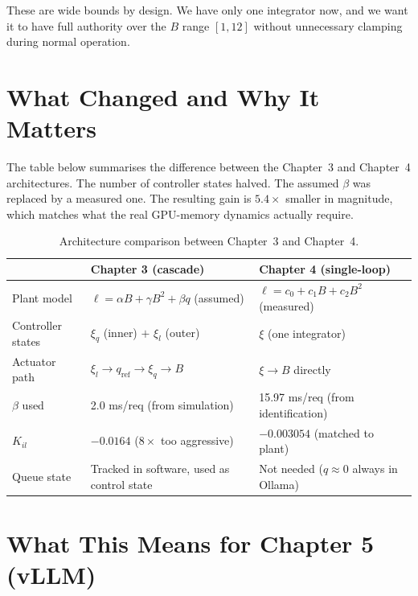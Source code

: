 \documentclass[11pt]{article}
\begin{document}
These are wide bounds by design.  We have only one integrator now, and
we want it to have full authority over the $B$ range $[1, 12]$ without
unnecessary clamping during normal operation.

\section*{What Changed and Why It Matters}

The table below summarises the difference between the Chapter~3 and
Chapter~4 architectures.  The number of controller states halved.  The
assumed $\beta$ was replaced by a measured one.  The resulting gain is
$5.4\times$ smaller in magnitude, which matches what the real GPU-memory
dynamics actually require.

\begin{table}[h]
\centering
\renewcommand{\arraystretch}{1.4}
\begin{tabular}{p{3.5cm} p{5.5cm} p{5.5cm}}
\toprule
& \textbf{Chapter 3 (cascade)} & \textbf{Chapter 4 (single-loop)} \\
\midrule
Plant model
  & $\ell = \alpha B + \gamma B^2 + \beta q$ (assumed)
  & $\ell = c_0 + c_1 B + c_2 B^2$ (measured) \\
Controller states
  & $\xi_q$ (inner) $+$ $\xi_l$ (outer)
  & $\xi$ (one integrator) \\
Actuator path
  & $\xi_l \to q_{\mathrm{ref}} \to \xi_q \to B$
  & $\xi \to B$ directly \\
$\beta$ used
  & 2.0 ms/req (from simulation)
  & 15.97 ms/req (from identification) \\
$K_{il}$
  & $-0.0164$ ($8\times$ too aggressive)
  & $-0.003054$ (matched to plant) \\
Queue state
  & Tracked in software, used as control state
  & Not needed ($q \approx 0$ always in Ollama) \\
\bottomrule
\end{tabular}
\caption{Architecture comparison between Chapter~3 and Chapter~4.}
\end{table}

\section*{What This Means for Chapter 5 (vLLM)}
\end{document}
